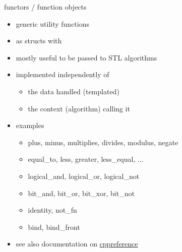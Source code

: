 \begin{frame}[fragile]
  \begin{block}{functors / function objects}
    \begin{itemize}
      \item generic utility functions
      \item as structs with 
      \item mostly useful to be passed to STL algorithms
    \item implemented independently of
      \begin{itemize}
      \item the data handled (templated)
      \item the context (algorithm) calling it
      \end{itemize}
    \item examples
      \begin{itemize}
      \item plus, minus, multiplies, divides, modulus, negate
      \item equal\_to, less, greater, less\_equal, ...
      \item logical\_and, logical\_or, logical\_not
      \item bit\_and, bit\_or, bit\_xor, bit\_not
      \item identity, not\_fn
      \item bind, bind\_front
      \end{itemize}
    \item see also documentation on \href{https://en.cppreference.com/w/cpp/utility/functional}{cppreference}
    \end{itemize}
  \end{block}
\end{frame}

